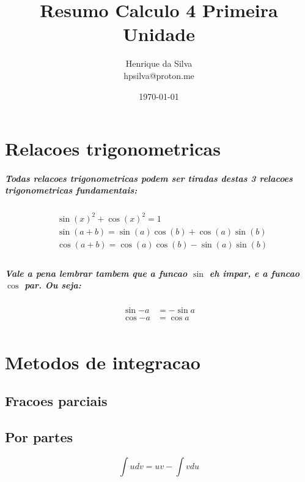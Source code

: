 \documentclass[12pt,twoside, a4paper, twocolumn]{article}
\title{Resumo Calculo 4 Primeira Unidade}
\author{Henrique da Silva \\ hpsilva@proton.me}
\date{\today}
\begin{document}
\maketitle
{}
\newpage
\tableofcontents
\newpage

\section{Relacoes trigonometricas}

\subparagraph*{Todas relacoes trigonometricas podem ser tiradas destas 3 relacoes trigonometricas fundamentais:}
\begin{equation}
    \begin{aligned}
         & \sin(x)^2 + \cos(x)^2  = 1                                 \\
         & \sin(a+b)              = \sin(a) \cos(b) + \cos(a) \sin(b) \\
         & \cos(a+b)              = \cos(a) \cos(b) - \sin(a) \sin(b) \\
    \end{aligned}
\end{equation}

\subparagraph*{Vale a pena lembrar tambem que a funcao $\sin$ eh impar, e a funcao $\cos$ par. Ou seja:}

\begin{equation}
    \begin{aligned}
        \sin{-a} & = - \sin{a} \\
        \cos{-a} & = \cos{a}   \\
    \end{aligned}
\end{equation}

\section{Metodos de integracao}

\subsection{Fracoes parciais}
\subsection{Por partes}

\begin{equation}
    \int {u dv} = u v - \int{v du}
\end{equation}
\end{document}
